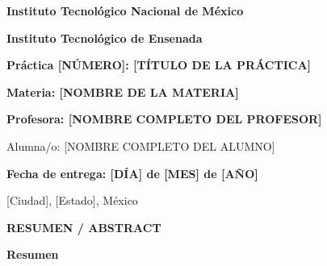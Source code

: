 \documentclass[12pt, a4paper]{article}
\begin{document}
\thispagestyle{empty}

\begin{center}
    \textbf{\Large Instituto Tecnológico Nacional de México}
    
    \vspace{0.2cm}
    
    \textbf{\large Instituto Tecnológico de Ensenada}
    
    \vspace{.5cm}
    
    {\textbf{\large Práctica [NÚMERO]: [TÍTULO DE LA PRÁCTICA]}}
    
    \vspace{0.5 cm}
    
    \textbf{Materia: [NOMBRE DE LA MATERIA]}
    
    \vspace{0.5cm}
    
    \textbf{Profesora: [NOMBRE COMPLETO DEL PROFESOR]}
    
    \vspace{0.5cm}
    
    {\large Alumna/o: [NOMBRE COMPLETO DEL ALUMNO]}
    
    \vspace{0.5cm}
    
    \textbf{Fecha de entrega: [DÍA] de [MES] de [AÑO]}
    
    \vspace{0.5cm}
    
    [Ciudad], [Estado], México
    
    \vspace{0.5cm}
    
    \vspace{0.5cm}
    
    \begin{center}
    \Large\bfseries RESUMEN / ABSTRACT
    \end{center}
    
    \vspace{0.5cm}
    
    \begin{minipage}{0.95\textwidth}
        \textbf{Resumen}
        

\end{minipage}
\end{center}
\end{document}
